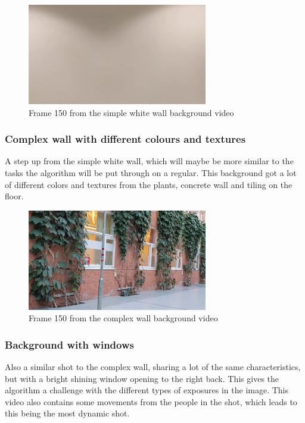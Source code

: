 \begin{figure}[H]
    \centering
    \includegraphics[width=0.7\textwidth]{img/video_frame_150/BG_White-Wall_150.jpg}
    \caption{Frame 150 from the simple white wall background video}
    \label{fig:background_white_wall}
\end{figure}


\subsubsection{Complex wall with different colours and textures}
A step up from the simple white wall, which will maybe be more similar to the tasks the algorithm will be put through on a regular. This background got a lot of different colors and textures from the plants, concrete wall and tiling on the floor.

\begin{figure}[H]
    \centering
    \includegraphics[width=0.7\textwidth]{img/video_frame_150/BG_Complex_150.jpg}
    \caption{Frame 150 from the complex wall background video}
    \label{fig:background_complex_wall}
\end{figure}

\subsubsection{Background with windows}
Also a similar shot to the complex wall, sharing a lot of the same characteristics, but with a bright shining window opening to the right back. This gives the algorithm a challenge with the different types of exposures in the image. This video also contains some movements from the people in the shot, which leads to this being the most dynamic shot. 

